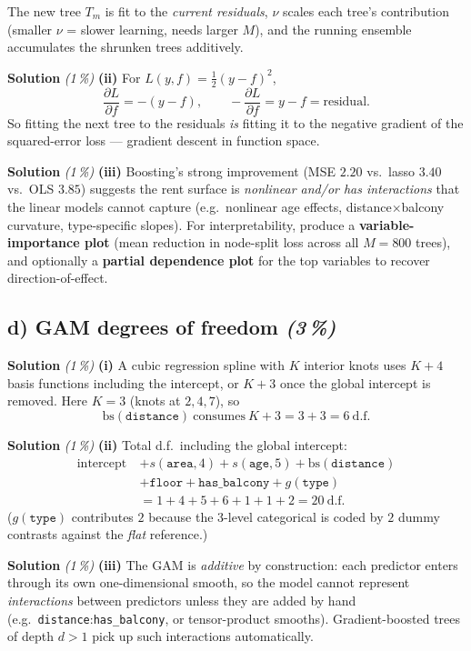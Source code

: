 \documentclass[11pt,a4paper]{article}
\newcommand{\subpoints}[1]{\textit{(#1\,\%)}}
\newcommand{\sol}{\noindent\textbf{Solution}}
\begin{document}
\noindent The new tree $T_m$ is fit to the \emph{current residuals}, $\nu$ scales each tree's
contribution (smaller $\nu$ = slower learning, needs larger $M$), and the running ensemble
accumulates the shrunken trees additively.

\medskip
\sol{} \subpoints{1} \textbf{(ii)} For $L(y,f) = \tfrac{1}{2}(y-f)^2$,
$$\frac{\partial L}{\partial f} = -(y-f), \qquad
   -\frac{\partial L}{\partial f} = y - f = \text{residual}.$$
So fitting the next tree to the residuals \emph{is} fitting it to the negative gradient of the
squared-error loss --- gradient descent in function space. \checkmark

\medskip
\sol{} \subpoints{1} \textbf{(iii)} Boosting's strong improvement (MSE $2.20$ vs.\ lasso $3.40$ vs.\
OLS $3.85$) suggests the rent surface is \emph{nonlinear and/or has interactions} that the linear
models cannot capture (e.g.\ nonlinear age effects, distance$\times$balcony curvature, type-specific
slopes). For interpretability, produce a \textbf{variable-importance plot} (mean reduction in
node-split loss across all $M=800$ trees), and optionally a \textbf{partial dependence plot} for
the top variables to recover direction-of-effect.

\subsection*{d) GAM degrees of freedom \subpoints{3}}

\sol{} \subpoints{1} \textbf{(i)} A cubic regression spline with $K$ interior knots uses $K+4$
basis functions including the intercept, or $K+3$ once the global intercept is removed. Here
$K=3$ (knots at $2, 4, 7$), so
$$\mathrm{bs}(\texttt{distance})\ \text{consumes}\ \boxed{K+3 = 3+3 = 6}\ \text{d.f.}$$

\medskip
\sol{} \subpoints{1} \textbf{(ii)} Total d.f.\ including the global intercept:
\begin{align*}
\text{intercept}\ &+ s(\texttt{area}, 4) + s(\texttt{age}, 5) + \mathrm{bs}(\texttt{distance}) \\
&+ \texttt{floor} + \texttt{has\_balcony} + g(\texttt{type}) \\
&= 1 + 4 + 5 + 6 + 1 + 1 + 2 = \boxed{20}\ \text{d.f.}
\end{align*}
($g(\texttt{type})$ contributes $2$ because the 3-level categorical is coded by $2$ dummy
contrasts against the \emph{flat} reference.)

\medskip
\sol{} \subpoints{1} \textbf{(iii)} The GAM is \emph{additive} by construction: each predictor
enters through its own one-dimensional smooth, so the model cannot represent \emph{interactions}
between predictors unless they are added by hand (e.g.\ \texttt{distance}:\texttt{has\_balcony},
or tensor-product smooths). Gradient-boosted trees of depth $d>1$ pick up such interactions
automatically.
\end{document}
